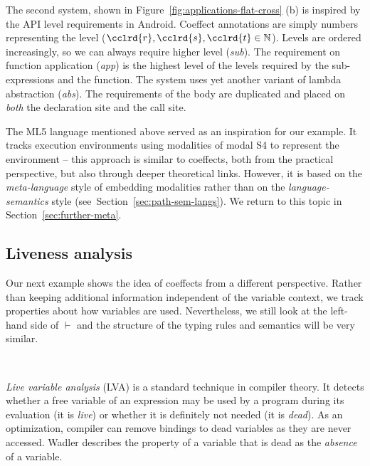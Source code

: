 The second system, shown in Figure~\ref{fig:applications-flat-cross} (b) is inspired by the API
level requirements in Android. Coeffect annotations are simply numbers representing the level
($\cclrd{r}, \cclrd{s}, \cclrd{t} \in \mathbb{N}$). Levels are ordered increasingly, so we can
always require higher level (\emph{sub}). The requirement on function application (\emph{app}) is
the highest level of the levels required by the sub-expressions and the function. The system uses
yet another variant of lambda abstraction (\emph{abs}). The requirements of the body are duplicated
and placed on \emph{both} the declaration site and the call site.

The ML5 language \cite{app-distributed-ml5} mentioned above served as an inspiration for our example.
It tracks execution environments using modalities of modal S4 to represent the environment -- this
approach is similar to coeffects, both from the practical perspective, but also through deeper
theoretical links. However, it is based on the \emph{meta-language} style of embedding modalities
rather than on the \emph{language-semantics} style (see~Section~\ref{sec:path-sem-langs}). We
return to this topic in Section~\ref{sec:further-meta}.


\subsection{Liveness analysis}
\label{sec:applications-flat-live}
Our next example shows the idea of coeffects from a different perspective. Rather than
keeping additional information independent of the variable context, we track properties about how
variables are used. Nevertheless, we still look at the left-hand side of $\vdash$ and the structure
of the typing rules and semantics will be very similar.

~

\emph{Live variable analysis} (LVA) \cite{app-modern-compiler} is a standard technique in compiler
theory. It detects whether a free variable of an expression may be used by a program during its
evaluation (it is \emph{live}) or whether it is definitely not needed (it is \emph{dead}). As an
optimization, compiler can remove bindings to dead variables as they are never accessed. Wadler
\cite{app-strictness-absecnce} describes the property of a variable that is dead as the
\emph{absence} of a variable.

